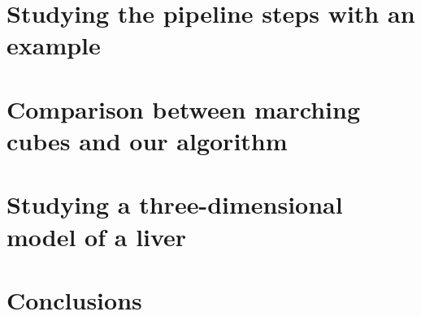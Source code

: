 \chapter{Studying the pipeline steps with an example}\label{Chapter41}
\thispagestyle{empty}

\chapter{Comparison between marching cubes and our algorithm}\label{Chapter42} %
\thispagestyle{empty}

\chapter{Studying a three-dimensional model of a liver}\label{Chapter43} %
\thispagestyle{empty}

\chapter{Conclusions}\label{Chapter44} %
\thispagestyle{empty}

